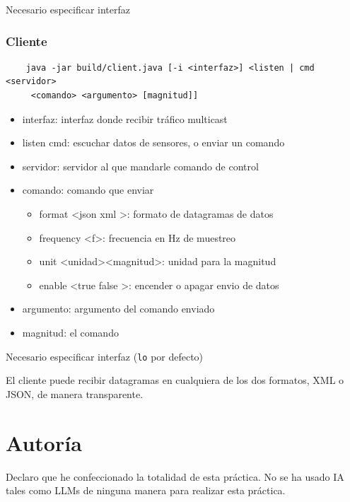 \documentclass[12pt]{article}
\begin{document}
    Necesario especificar interfaz

    \subsubsection{Cliente}

    \begin{verbatim}
    java -jar build/client.java [-i <interfaz>] <listen | cmd <servidor>
     <comando> <argumento> [magnitud]]
    \end{verbatim}

    \begin{itemize}
    \item interfaz: interfaz donde recibir tráfico multicast
    \item listen \textbar cmd: escuchar datos de sensores, o enviar un comando
    \item servidor: servidor al que mandarle comando de control
    \item comando: comando que enviar
    \begin{itemize}
        \item format \textless json \textbar xml \textgreater: formato de datagramas de datos
        \item frequency \textless f\textgreater: frecuencia en Hz de muestreo
        \item unit \textless unidad\textgreater \textless magnitud\textgreater: unidad para la magnitud
        \item enable \textless true \textbar false \textgreater: encender o apagar envio de datos
    \end{itemize}
    \item argumento: argumento del comando enviado
    \item magnitud: el comando
    \end{itemize}

    Necesario especificar interfaz (\texttt{lo} por defecto)

    El cliente puede recibir datagramas en cualquiera de los dos formatos, XML o JSON,
    de manera transparente.

    \section{Autoría}

    Declaro que he confeccionado la totalidad de esta práctica.
    No se ha usado IA tales como LLMs de ninguna manera para realizar esta práctica.
\end{document}
